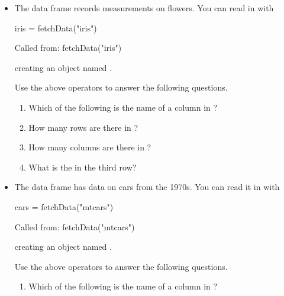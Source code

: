 \begin{itemize}

\item The data frame  records measurements on flowers. You can read in with 
\begin{Schunk}
\begin{Sinput}
  iris = fetchData("iris")
\end{Sinput}
\begin{Soutput}
Called from: fetchData("iris")
\end{Soutput}
\end{Schunk}
creating an object named .

Use the above operators to answer the following questions.

\begin{enumerate}
\item Which of the following is the name of a column in ?\\


\item How many rows are there in ?\\

\item How many columns are there in ?\\

\item What is the  in the third row?\\

\end{enumerate}

\item The data frame  has data on cars from the 1970s.  
You can read it in with 
\begin{Schunk}
\begin{Sinput}
  cars = fetchData("mtcars")
\end{Sinput}
\begin{Soutput}
Called from: fetchData("mtcars")
\end{Soutput}
\end{Schunk}
creating an object named .

Use the above operators to answer the following questions.
\begin{enumerate}
\item Which of the following is the name of a column in ?


\end{enumerate}
\end{itemize}
